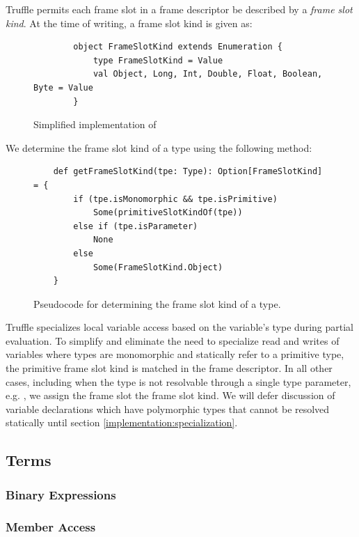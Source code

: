Truffle permits each frame slot in a frame descriptor be described by a \textit{frame slot kind}. At the time of writing, a frame slot kind is given as:

\begin{figure}[H]
	\begin{verbatim}
		object FrameSlotKind extends Enumeration {
			type FrameSlotKind = Value
			val Object, Long, Int, Double, Float, Boolean, Byte = Value
		}
	\end{verbatim}
	\caption{Simplified implementation of }
\end{figure}

We determine the frame slot kind of a type using the following method:

\begin{figure}[H]
	\begin{verbatim}
	def getFrameSlotKind(tpe: Type): Option[FrameSlotKind] = {
		if (tpe.isMonomorphic && tpe.isPrimitive)
			Some(primitiveSlotKindOf(tpe))
		else if (tpe.isParameter)
			None
		else
			Some(FrameSlotKind.Object)
	}	
	\end{verbatim}
	\caption{Pseudocode for determining the frame slot kind of a type.}
\end{figure}

Truffle specializes local variable access based on the variable's type during partial evaluation\cite{truffle:pe}. To simplify and eliminate the need to specialize read and writes of variables where types are monomorphic and statically refer to a primitive type, the primitive frame slot kind is matched in the frame descriptor. In all other cases, including when the type is not resolvable through a single type parameter, e.g. , we assign the frame slot the  frame slot kind. We will defer discussion of variable declarations which have polymorphic types that cannot be resolved statically until section \ref{implementation:specialization}.

\subsection*{Terms}

\subsubsection*{Binary Expressions}

\subsubsection*{Member Access}

